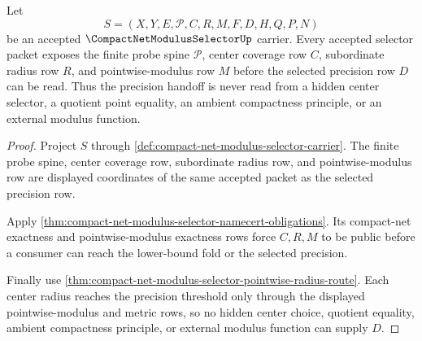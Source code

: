 \begin{theorem}
\label{thm:compact-net-modulus-selector-center-ledger-exposure}
Let
$$
S=(X,Y,E,\mathcal{P},C,R,M,F,D,H,Q,P,N)
$$
be an accepted $\CompactNetModulusSelectorUp$ carrier. Every accepted selector packet exposes the finite probe spine $\mathcal{P}$, center coverage row $C$, subordinate radius row $R$, and pointwise-modulus row $M$ before the selected precision row $D$ can be read. Thus the precision handoff is never read from a hidden center selector, a quotient point equality, an ambient compactness principle, or an external modulus function.
\end{theorem}
\begin{proof}
Project $S$ through \autoref{def:compact-net-modulus-selector-carrier}. The finite probe spine, center coverage row, subordinate radius row, and pointwise-modulus row are displayed coordinates of the same accepted packet as the selected precision row.

Apply \autoref{thm:compact-net-modulus-selector-namecert-obligations}. Its compact-net exactness and pointwise-modulus exactness rows force $C,R,M$ to be public before a consumer can reach the lower-bound fold or the selected precision.

Finally use \autoref{thm:compact-net-modulus-selector-pointwise-radius-route}. Each center radius reaches the precision threshold only through the displayed pointwise-modulus and metric rows, so no hidden center choice, quotient equality, ambient compactness principle, or external modulus function can supply $D$.
\end{proof}

